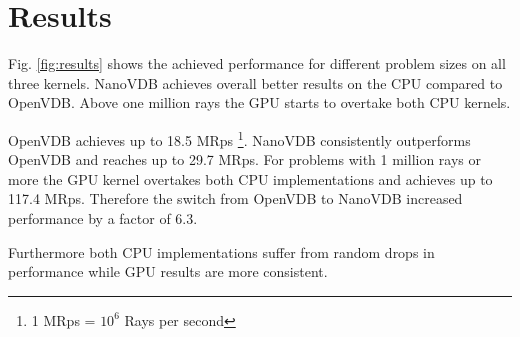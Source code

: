 \section{Results}

Fig. \ref{fig:results} shows the achieved performance for different problem sizes on all three kernels.
NanoVDB achieves overall better results on the CPU compared to OpenVDB. 
Above one million rays the GPU starts to overtake both CPU kernels.

OpenVDB achieves up to 18.5 MRps \footnote{1 MRps = $10^6$ Rays per second}. NanoVDB consistently outperforms OpenVDB and reaches up to 29.7 MRps.
For problems with 1 million rays or more the GPU kernel overtakes both CPU implementations and achieves up to 117.4 MRps.
Therefore the switch from OpenVDB to NanoVDB increased performance by a factor of 6.3.
 
Furthermore both CPU implementations suffer from random drops in performance while GPU results are more consistent. 


